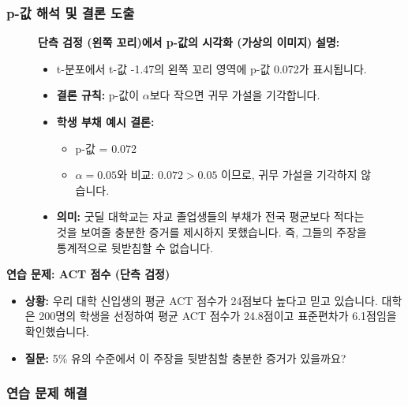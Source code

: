 \documentclass[11pt,a4paper]{book}
\providecommand{\captionof}[2]{\textbf{#2}}
\theoremstyle{definition}
\begin{document}
\subsubsection*{p-값 해석 및 결론 도출}

\begin{figure}[h!]
    \centering
    \captionof{figure}{단측 검정 (왼쪽 꼬리)에서 p-값의 시각화 (가상의 이미지)}
    \label{fig:one_tail_left_p_value}
    \vspace{0.5em}
    \textbf{설명:}
    \begin{itemize}
        \item t-분포에서 t-값 -1.47의 왼쪽 꼬리 영역에 p-값 0.072가 표시됩니다.
        \item \textbf{결론 규칙:} p-값이 $\alpha$보다 작으면 귀무 가설을 기각합니다.
        \item \textbf{학생 부채 예시 결론:}
            \begin{itemize}
                \item p-값 = 0.072
                \item $\alpha = 0.05$와 비교: $0.072 > 0.05$ 이므로, 귀무 가설을 기각하지 않습니다.
            \end{itemize}
        \item \textbf{의미:} 굿딜 대학교는 자교 졸업생들의 부채가 전국 평균보다 적다는 것을 보여줄 충분한 증거를 제시하지 못했습니다. 즉, 그들의 주장을 통계적으로 뒷받침할 수 없습니다.
    \end{itemize}
\end{figure}

\begin{examplebox}
\textbf{연습 문제: ACT 점수 (단측 검정)}
\begin{itemize}
    \item \textbf{상황:} 우리 대학 신입생의 평균 ACT 점수가 24점보다 높다고 믿고 있습니다. 대학은 200명의 학생을 선정하여 평균 ACT 점수가 24.8점이고 표준편차가 6.1점임을 확인했습니다.
    \item \textbf{질문:} 5\% 유의 수준에서 이 주장을 뒷받침할 충분한 증거가 있을까요?
\end{itemize}
\end{examplebox}

\subsubsection*{연습 문제 해결}
\end{document}
